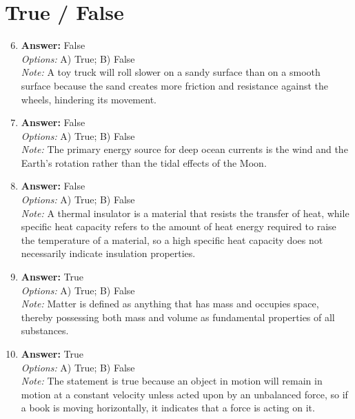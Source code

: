 \documentclass[12pt]{article}
\begin{document}
\section*{True / False}
\begin{enumerate}[label=\arabic*.]
\setcounter{enumi}{5}
\item \textbf{Answer:} False
\\ \textit{Options:} A) True; B) False
\\ \textit{Note:} A toy truck will roll slower on a sandy surface than on a smooth surface because the sand creates more friction and resistance against the wheels, hindering its movement.
\item \textbf{Answer:} False
\\ \textit{Options:} A) True; B) False
\\ \textit{Note:} The primary energy source for deep ocean currents is the wind and the Earth's rotation rather than the tidal effects of the Moon.
\item \textbf{Answer:} False
\\ \textit{Options:} A) True; B) False
\\ \textit{Note:} A thermal insulator is a material that resists the transfer of heat, while specific heat capacity refers to the amount of heat energy required to raise the temperature of a material, so a high specific heat capacity does not necessarily indicate insulation properties.
\item \textbf{Answer:} True
\\ \textit{Options:} A) True; B) False
\\ \textit{Note:} Matter is defined as anything that has mass and occupies space, thereby possessing both mass and volume as fundamental properties of all substances.
\item \textbf{Answer:} True
\\ \textit{Options:} A) True; B) False
\\ \textit{Note:} The statement is true because an object in motion will remain in motion at a constant velocity unless acted upon by an unbalanced force, so if a book is moving horizontally, it indicates that a force is acting on it.
\end{enumerate}
\end{document}

